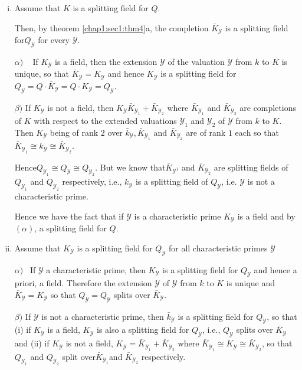 \begin{enumerate}[(i)]
\item Assume that $K$ is a splitting field for $Q$.

  Then, by theorem \ref{chap1:sec1:thm4}a, the completion $\bar{K}_{\mathscr{Y}}$ is a
  splitting field for$Q_{\mathscr{Y}}$ for every $\mathscr{Y}$. 

  $\alpha)$ ~ If $K_{\mathscr{Y}}$ is a field, then the extension
  $\mathscr{Y}$ of the valuation $\mathscr{Y}$ from $k$ to $K$ is
  unique, so that $\bar{K}_{\mathscr{Y}} =K_{\mathscr{Y}}$ and hence
  $K_{\mathscr{Y}}$ is a splitting field for $Q_{\mathscr{Y} }= Q\cdot \bar{K}_{\mathscr{Y}}=
  Q\cdot K_{\mathscr{Y}} = Q_{\mathscr{Y}}$. 

  $\beta)$ If $K_{\mathscr{Y}}$ is not a field, then $K_{\mathscr{Y}}
  \bar{K}_{\mathscr{Y}_1}+ \bar{K}_{\mathscr{Y}_2}$ where
  $\bar{K}_{\mathscr{Y}_1}$ and $\bar{K}_{\mathscr{Y}_2}$ are
  completions of $K$ with respect to the extended valuations
  $\mathscr{Y}_1$ and $\mathscr{Y}_2$ of $\mathscr{Y}$ from $k$ to
  $K$. Then  $K_{\mathscr{Y}}$ being of rank $2$ over
  $\bar{k}_{\mathscr{Y}}, \bar{K}_{\mathscr{Y}_1}$ and
  $\bar{K}_{\mathscr{Y}_2}$ are of rank $1$ each so that
  $\bar{K}_{\mathscr{Y}_1} \cong k_{\mathscr{Y}} \cong
  \bar{K}_{\mathscr{Y}_2}$. 

  Hence\pageoriginale $Q_{\mathscr{Y}_1} \cong Q_{\mathscr{Y}} \cong
  Q_{\mathscr{Y}_2}$. But we know that$\bar{K}_{\mathscr{Y}^1}$ and
  $\bar{K}_{\mathscr{Y}_2}$ are splitting fields of
  $Q_{\mathscr{Y}_1}$ and $Q_{\mathscr{Y}_2}$ respectively, i.e.,
  $k_{\mathscr{Y}}$ is a splitting field of $Q_{\mathscr{Y}}$,
  i.e. $\mathscr{Y}$ is not a characteristic prime. 

  Hence we have the fact that if $\mathscr{Y}$ is a characteristic
  prime $K_{\mathscr{Y}}$ is a field and by $(\alpha)$, a splitting
  field for $Q$. 
\item Assume that $K_{\mathscr{Y}}$ is a splitting field for
  $Q_{\mathscr{Y}}$ for all characteristic primes $\mathscr{Y}$ 
  
  $\alpha)$ ~If $\mathscr{Y}$ a characteristic prime, then
  $K_{\mathscr{Y}}$ is a splitting field for $Q_{\mathscr{Y}}$ and
  hence a priori, a field. Therefore the extension $\mathscr{Y}$ of
  $\mathscr{Y}$ from $k$ to $K$ is unique and $\bar{K}_{\mathscr{Y}} =
  K_{\mathscr{Y}}$ so that $Q_{\mathscr{Y}} = Q_{\mathscr{Y}}$ splits
  over $\bar{K}_{\mathscr{Y}}$. 
  
  $\beta)$ If $\mathscr{Y}$ is not a characteristic prime, then
  $\bar{k}_{\mathscr{Y}}$ is a splitting field for $Q_{\mathscr{Y}}$,
  so that (i) if $K_{\mathscr{Y}}$ is a field, $K_{\mathscr{Y}}$ is
  also a splitting field for $Q_{\mathscr{Y}}$, i.e.,
  $Q_{\mathscr{Y}}$ splits over $\bar{K}_{\mathscr{Y}}$ and (ii) if
  $K_{\mathscr{Y}}$ is not a field, $K_{\mathscr{Y}} =
  \bar{K}_{\mathscr{Y_1}} + \bar{K}_{\mathscr{Y}_2}$ where
  $\bar{K}_{\mathscr{Y}_1} \cong K_{\mathscr{Y}} \cong
  \bar{K}_{\mathscr{Y}_2}$, so that $Q_{\mathscr{Y}_1}$ and
  $Q_{\mathscr{Y}_2}$ split over$\bar{K}_{\mathscr{Y}_1}$and
  $\bar{K}_{\mathscr{Y}_2}$ respectively. 


\end{enumerate}
